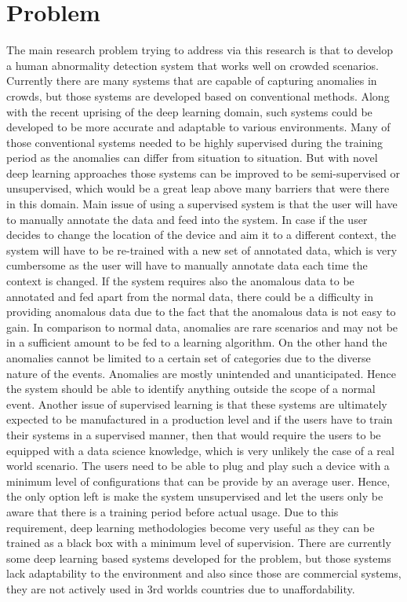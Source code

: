 \documentclass[a4paper,12pt]{report}
\begin{document}
\section{Problem}

The main research problem trying to address via this research is that to develop a human abnormality detection system that works well on crowded scenarios. Currently there are many systems that are capable of capturing anomalies in crowds, but those systems are developed based on conventional methods. Along with the recent uprising of the deep learning domain, such systems could be developed to be more accurate and adaptable to various environments. Many of those conventional systems needed to be highly supervised during the training period as the anomalies can differ from situation to situation. But with novel deep learning approaches those systems can be improved to be semi-supervised or unsupervised, which would be a great leap above many barriers that were there in this domain. Main issue of using a supervised system is that the user will have to manually annotate the data and feed into the system. In case if the user decides to change the location of the device and aim it to a different context, the system will have to be re-trained with a new set of annotated data, which is very cumbersome as the user will have to manually annotate data each time the context is changed. If the system requires also  the anomalous data to be annotated and fed apart from the normal data, there could be a difficulty in providing anomalous data due to the fact that the anomalous data is not easy to gain. In comparison to normal data, anomalies are rare scenarios and may not be in a sufficient amount to be fed to a learning algorithm. On the other hand the anomalies cannot be limited to a certain set of categories due to the diverse nature of the events. Anomalies are mostly unintended and unanticipated. Hence the system should be able to identify anything outside the scope of a normal event. Another issue of supervised learning is that these systems are ultimately expected to be manufactured in a production level and if the users have to train their systems in a supervised manner, then that would require the users to be equipped with a data science knowledge, which is very unlikely the case of a real world scenario. The users need to be able to plug and play such a device with a minimum level of configurations that can be provide by an average user. Hence, the only option left is make the system unsupervised and let the users only be aware that there is a training period before actual usage. Due to this requirement, deep learning methodologies become very useful as they can be trained as a black box with a minimum level of supervision. There are currently some deep learning based systems developed for the problem, but those systems lack adaptability to the environment and also since those are commercial systems, they are not actively used in 3rd worlds countries due to unaffordability. 
\end{document}
